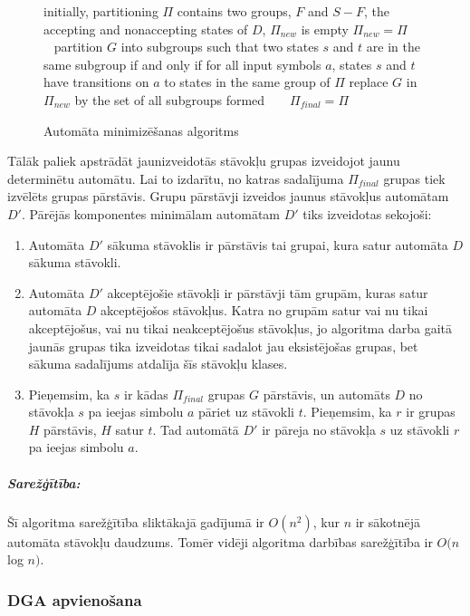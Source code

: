 \begin{figure}[H]
  \begin{algorithmic}
  \State initially, partitioning $\Pi$ contains two groups, $F$ and $S-F$, the accepting and nonaccepting states of $D$, $\Pi_{new}$ is empty
      \State $\Pi_{new} = \Pi$
          \State partition $G$ into subgroups such that two states $s$ and $t$ are in the same subgroup if and only if for all input symbols $a$, states $s$ and $t$ have transitions on $a$ to states in the same group of $\Pi$
          \State replace $G$ in $\Pi_{new}$ by the set of all subgroups formed
      \EndFor
  \EndWhile
  \State $\Pi_{final} = \Pi$
  \end{algorithmic}
  \caption{\label{fig:min_algorithm}Automāta minimizēšanas algoritms}
\end{figure}

Tālāk paliek apstrādāt jaunizveidotās stāvokļu grupas izveidojot jaunu determinētu automātu. Lai to izdarītu, no katras sadalījuma $\Pi_{final}$ grupas tiek izvēlēts grupas pārstāvis. Grupu pārstāvji izveidos jaunus stāvokļus automātam $D'$. Pārējās komponentes minimālam automātam $D'$ tiks izveidotas sekojoši:
\begin{enumerate}
\item Automāta $D'$ sākuma stāvoklis ir pārstāvis tai grupai, kura satur automāta $D$ sākuma stāvokli.
\item Automāta $D'$ akceptējošie stāvokļi ir pārstāvji tām grupām, kuras satur automāta $D$ akceptējošos stāvokļus. Katra no grupām satur vai nu tikai akceptējošus, vai nu tikai neakceptējošus stāvokļus, jo algoritma darba gaitā jaunās grupas tika izveidotas tikai sadalot jau eksistējošas grupas, bet sākuma sadalījums atdalīja šīs stāvokļu klases.
\item Pieņemsim, ka $s$ ir kādas $\Pi_{final}$ grupas $G$ pārstāvis, un automāts $D$ no stāvokļa $s$ pa ieejas simbolu $a$ pāriet uz stāvokli $t$. Pieņemsim, ka $r$ ir grupas $H$ pārstāvis, $H$ satur $t$. Tad automātā $D'$ ir pāreja no stāvokļa $s$ uz stāvokli $r$ pa ieejas simbolu $a$.
\end{enumerate}

\subparagraph{Sarežģītība:}
Šī algoritma sarežģītība sliktākajā gadījumā ir $O(n^2)$, kur $n$ ir sākotnējā automāta stāvokļu daudzums. Tomēr vidēji algoritma darbības sarežģītība ir $O(n$ log $n)$. \cite{Bassino:ComplexityMinimization}

\subsubsection{DGA apvienošana}

